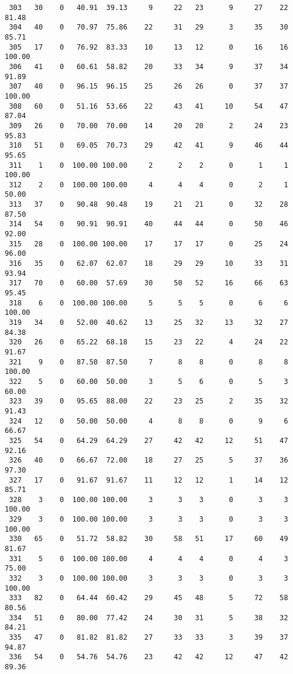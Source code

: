 \begin{verbatim}
 303   30    0   40.91  39.13     9     22   23      9     27    22    81.48
 304   40    0   70.97  75.86    22     31   29      3     35    30    85.71
 305   17    0   76.92  83.33    10     13   12      0     16    16   100.00
 306   41    0   60.61  58.82    20     33   34      9     37    34    91.89
 307   40    0   96.15  96.15    25     26   26      0     37    37   100.00
 308   60    0   51.16  53.66    22     43   41     10     54    47    87.04
 309   26    0   70.00  70.00    14     20   20      2     24    23    95.83
 310   51    0   69.05  70.73    29     42   41      9     46    44    95.65
 311    1    0  100.00 100.00     2      2    2      0      1     1   100.00
 312    2    0  100.00 100.00     4      4    4      0      2     1    50.00
 313   37    0   90.48  90.48    19     21   21      0     32    28    87.50
 314   54    0   90.91  90.91    40     44   44      0     50    46    92.00
 315   28    0  100.00 100.00    17     17   17      0     25    24    96.00
 316   35    0   62.07  62.07    18     29   29     10     33    31    93.94
 317   70    0   60.00  57.69    30     50   52     16     66    63    95.45
 318    6    0  100.00 100.00     5      5    5      0      6     6   100.00
 319   34    0   52.00  40.62    13     25   32     13     32    27    84.38
 320   26    0   65.22  68.18    15     23   22      4     24    22    91.67
 321    9    0   87.50  87.50     7      8    8      0      8     8   100.00
 322    5    0   60.00  50.00     3      5    6      0      5     3    60.00
 323   39    0   95.65  88.00    22     23   25      2     35    32    91.43
 324   12    0   50.00  50.00     4      8    8      0      9     6    66.67
 325   54    0   64.29  64.29    27     42   42     12     51    47    92.16
 326   40    0   66.67  72.00    18     27   25      5     37    36    97.30
 327   17    0   91.67  91.67    11     12   12      1     14    12    85.71
 328    3    0  100.00 100.00     3      3    3      0      3     3   100.00
 329    3    0  100.00 100.00     3      3    3      0      3     3   100.00
 330   65    0   51.72  58.82    30     58   51     17     60    49    81.67
 331    5    0  100.00 100.00     4      4    4      0      4     3    75.00
 332    3    0  100.00 100.00     3      3    3      0      3     3   100.00
 333   82    0   64.44  60.42    29     45   48      5     72    58    80.56
 334   51    0   80.00  77.42    24     30   31      5     38    32    84.21
 335   47    0   81.82  81.82    27     33   33      3     39    37    94.87
 336   54    0   54.76  54.76    23     42   42     12     47    42    89.36

\end{verbatim}
